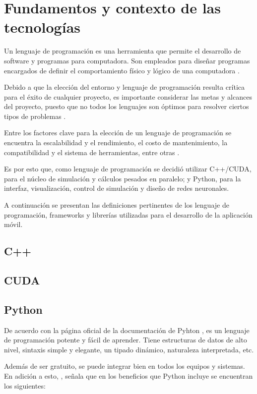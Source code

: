 \section{Fundamentos y contexto de las tecnologías}

Un lenguaje de programación es una herramienta que permite el desarrollo de software y programas para computadora. Son empleados para diseñar programas encargados de definir el comportamiento físico y lógico de una computadora \cite{uapaLenguajes}.

Debido a que la elección del entorno y lenguaje de programación resulta crítica para el éxito de cualquier proyecto, es importante considerar las metas y alcances del proyecto, puesto que no todos los lenguajes son óptimos para resolver ciertos tipos de problemas \cite{clickpandaEntorno}.

Entre los factores clave para la elección de un lenguaje de programación se encuentra la escalabilidad y el rendimiento, el costo de mantenimiento, la compatibilidad y el sistema de herramientas, entre otras \cite{clickpandaEntorno}.

Es por esto que, como lenguaje de programación se decidió utilizar C++/CUDA, para el núcleo de simulación y cálculos pesados en paralelo; y Python, para la interfaz, visualización, control de simulación y diseño de redes neuronales. 

A continuación se presentan las definiciones pertinentes de los lenguaje de programación, frameworks y librerías utilizadas para el desarrollo de la aplicación móvil.

\subsection{C++}

\subsection{CUDA}

\subsection{Python}

De acuerdo con la página oficial de la documentación de Pyhton \cite{pythonTutorial}, es un lenguaje de programación potente y fácil de aprender. Tiene estructuras de datos de alto nivel, sintaxis simple y elegante, un tipado dinámico, naturaleza interpretada, etc. 

Además de ser gratuito, se puede integrar bien en todos los equipos y sistemas. En adición a esto, \cite{awsPython}, señala que en los beneficios que Python incluye se encuentran los siguientes:

